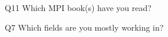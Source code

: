 \begin{description}%
\item{Q11} Which MPI book(s) have you read?%
\item{Q7} Which fields are you mostly working in?%
\end{description}%
